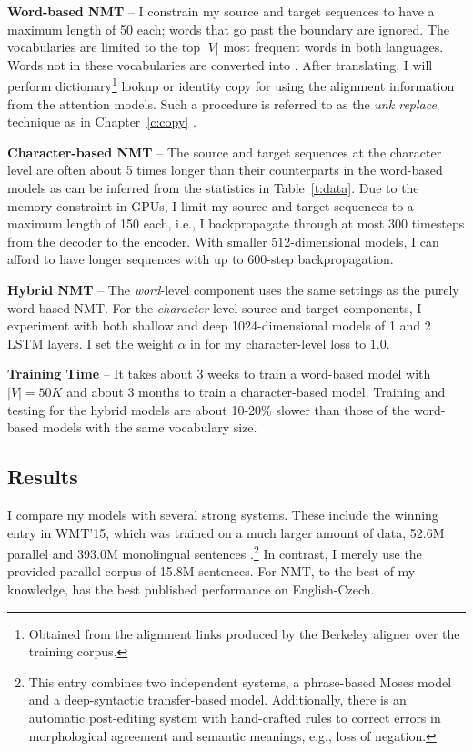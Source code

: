 {\bf Word-based NMT} -- I constrain my source and target sequences to
have a maximum length of 50 each; words that go past the boundary are ignored.
The vocabularies are limited to the top $|V|$ most
frequent words in both languages. Words not in these vocabularies
are converted into \unk{}. After translating, I will perform
dictionary\footnote{Obtained from the alignment links produced by the Berkeley
aligner \cite{liang06alignment} over
the training corpus.} lookup or
identity copy for \unk{} using the alignment information from the
attention models. Such a procedure is referred to as the {\it unk replace}
technique as in Chapter~\ref{c:copy} \cite{luong15,jean15}.

{\bf Character-based NMT} -- The source and
target sequences at the character level are often about 5 times longer than their counterparts in the
word-based models as can be inferred from the statistics in
Table~\ref{t:data}. Due to the memory constraint in GPUs, I limit my source and
target sequences to a maximum length of 150 each, i.e., I backpropagate
through at most 300 timesteps from the decoder to the encoder. With
smaller 512-dimensional models, I can afford to have longer sequences with up
to 600-step backpropagation. 

{\bf Hybrid NMT} -- The {\it word}-level component uses the
same settings as the purely word-based NMT. For the {\it character}-level source
and target components, I experiment with both shallow and deep 1024-dimensional models of
1 and 2 LSTM layers. 
I
set the weight $\alpha$ in  for my character-level loss to
$1.0$.

{\bf Training Time} -- It takes about 3 weeks to train a word-based model with
$|V|=50K$ and about 3 months to train a character-based model. Training and
testing for the hybrid models are about 10-20\% slower than those of the word-based
models with the same vocabulary size.

\subsection{Results}

I compare my models with several strong systems. These include the
winning entry in WMT'15, which was
trained on a much larger amount of data, 52.6M parallel
 and 393.0M monolingual sentences \cite{bojar15wmt}.\footnote{This
entry combines two independent
systems, a phrase-based Moses model and a deep-syntactic transfer-based model.
Additionally, there is  an automatic
post-editing system with hand-crafted rules to correct errors
in morphological agreement and semantic meanings, e.g., loss of negation.}
In contrast, I merely use the
provided parallel corpus of 15.8M sentences.
For NMT, to the best of my knowledge, \cite{jean15wmt} has
the best published performance on English-Czech.

